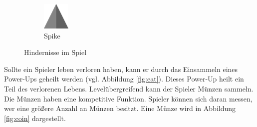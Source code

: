 \begin{figure}[H]
\begin{subfigure}[H]{0.15\textwidth}
        \includegraphics[width=\textwidth]{img/realisierung/assets/spike}
        \caption{Spike}
        \label{fig:spike}
    \end{subfigure}
    \caption{Hindernisse im Spiel}
    \label{fig:maceandspike}
\end{figure}

Sollte ein Spieler leben verloren haben, kann er durch das Einsammeln eines Power-Ups geheilt werden (vgl. Abbildung \ref{fig:eat}). Dieses Power-Up heilt ein Teil des verlorenen Lebens. 
Levelübergreifend kann der Spieler Münzen sammeln. Die Münzen haben eine kompetitive Funktion. Spieler können sich daran messen, wer eine größere Anzahl an Münzen besitzt. Eine Münze wird in Abbildung \ref{fig:coin} dargestellt.

